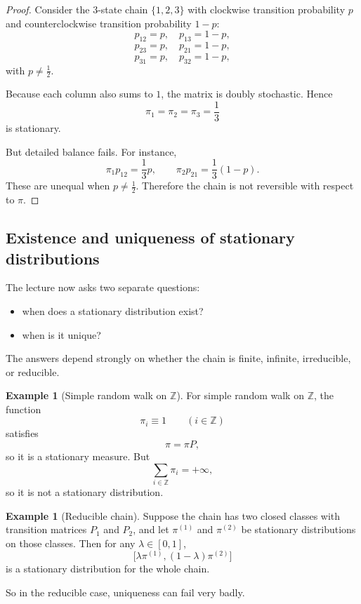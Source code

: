 \documentclass[11pt]{article}
\theoremstyle{definition}
\newtheorem{example}[theorem]{Example}
\begin{document}
\begin{proof}
Consider the \(3\)-state chain \(\{1,2,3\}\) with clockwise transition probability \(p\) and counterclockwise transition probability \(1-p\):
\[
p_{12}=p,\quad p_{13}=1-p,
\]
\[
p_{23}=p,\quad p_{21}=1-p,
\]
\[
p_{31}=p,\quad p_{32}=1-p,
\]
with \(p\neq \frac12\).

Because each column also sums to \(1\), the matrix is doubly stochastic. Hence
\[
\pi_1=\pi_2=\pi_3=\frac13
\]
is stationary.

But detailed balance fails. For instance,
\[
\pi_1 p_{12}
=
\frac13 p,
\qquad
\pi_2 p_{21}
=
\frac13(1-p).
\]
These are unequal when \(p\neq \frac12\). Therefore the chain is not reversible with respect to \(\pi\).
\end{proof}

\subsection{Existence and uniqueness of stationary distributions}

The lecture now asks two separate questions:
\begin{itemize}[leftmargin=2em]
    \item when does a stationary distribution exist?
    \item when is it unique?
\end{itemize}

The answers depend strongly on whether the chain is finite, infinite, irreducible, or reducible.

\begin{example}[Simple random walk on \(\mathbb Z\)]
For simple random walk on \(\mathbb Z\), the function
\[
\pi_i\equiv 1
\qquad (i\in \mathbb Z)
\]
satisfies
\[
\pi=\pi P,
\]
so it is a stationary measure. But
\[
\sum_{i\in\mathbb Z}\pi_i=+\infty,
\]
so it is not a stationary distribution.
\end{example}

\begin{example}[Reducible chain]
Suppose the chain has two closed classes with transition matrices \(P_1\) and \(P_2\), and let \(\pi^{(1)}\) and \(\pi^{(2)}\) be stationary distributions on those classes. Then for any \(\lambda\in[0,1]\),
\[
\bigl[\lambda \pi^{(1)},(1-\lambda)\pi^{(2)}\bigr]
\]
is a stationary distribution for the whole chain.

So in the reducible case, uniqueness can fail very badly.
\end{example}
\end{document}
